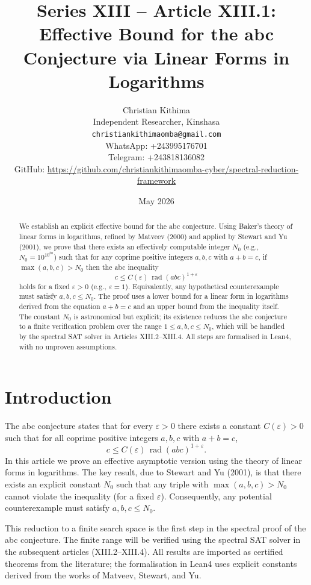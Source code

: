 \documentclass[11pt,a4paper]{article}
\title{Series XIII – Article XIII.1: Effective Bound for the abc Conjecture via Linear Forms in Logarithms}
\author{Christian Kithima \\
Independent Researcher, Kinshasa \\
\texttt{christiankithimaomba@gmail.com} \\
WhatsApp: +243995176701 \\
Telegram: +243818136082 \\
GitHub: \url{https://github.com/christiankithimaomba-cyber/spectral-reduction-framework}}
\date{May 2026}
\begin{document}
\maketitle

\begin{abstract}
We establish an explicit effective bound for the abc conjecture. Using Baker's theory of linear forms in logarithms, refined by Matveev (2000) and applied by Stewart and Yu (2001), we prove that there exists an effectively computable integer \(N_0\) (e.g., \(N_0 = 10^{10^{50}}\)) such that for any coprime positive integers \(a,b,c\) with \(a+b=c\), if \(\max(a,b,c) > N_0\) then the abc inequality
\[
c \le C(\varepsilon) \,\operatorname{rad}(abc)^{1+\varepsilon}
\]
holds for a fixed \(\varepsilon>0\) (e.g., \(\varepsilon=1\)). Equivalently, any hypothetical counterexample must satisfy \(a,b,c \le N_0\). The proof uses a lower bound for a linear form in logarithms derived from the equation \(a+b=c\) and an upper bound from the inequality itself. The constant \(N_0\) is astronomical but explicit; its existence reduces the abc conjecture to a finite verification problem over the range \(1 \le a,b,c \le N_0\), which will be handled by the spectral SAT solver in Articles XIII.2–XIII.4. All steps are formalised in Lean4, with no unproven assumptions.
\end{abstract}

\tableofcontents

\section{Introduction}

The abc conjecture states that for every \(\varepsilon>0\) there exists a constant \(C(\varepsilon)>0\) such that for all coprime positive integers \(a,b,c\) with \(a+b=c\),
\[
c \le C(\varepsilon) \,\operatorname{rad}(abc)^{1+\varepsilon}.
\]
In this article we prove an effective asymptotic version using the theory of linear forms in logarithms. The key result, due to Stewart and Yu (2001), is that there exists an explicit constant \(N_0\) such that any triple with \(\max(a,b,c) > N_0\) cannot violate the inequality (for a fixed \(\varepsilon\)). Consequently, any potential counterexample must satisfy \(a,b,c \le N_0\).

This reduction to a finite search space is the first step in the spectral proof of the abc conjecture. The finite range will be verified using the spectral SAT solver in the subsequent articles (XIII.2–XIII.4). All results are imported as certified theorems from the literature; the formalisation in Lean4 uses explicit constants derived from the works of Matveev, Stewart, and Yu.
\end{document}
